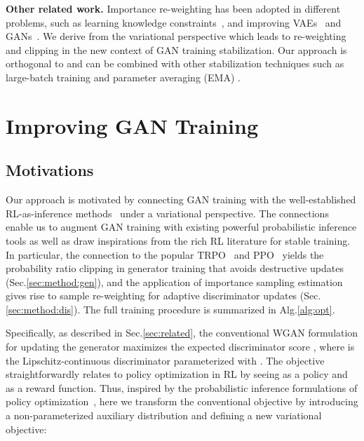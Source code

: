 \documentclass{article}
\newcommand{\0}{\bm{0}}
\begin{document}
\textbf{Other related work.} 
Importance re-weighting has been adopted in different problems, such as learning knowledge constraints~\cite{hu2018deep}, and improving VAEs~\cite{burda2015importance} and GANs~\citep{hu2017unifying,song2019bridging}. 
We derive from the variational perspective which leads to re-weighting and clipping in the new context of GAN training stabilization. Our approach is orthogonal to and can be combined with other stabilization techniques such as large-batch training \citep{brock2018large} and parameter averaging (EMA) \citep{yaz2018unusual,brock2018large}. 










\section{Improving GAN Training}
\subsection{Motivations}
Our approach is motivated by connecting GAN training with the well-established RL-as-inference methods~\cite{abdolmaleki2018maximum,levine2018reinforcement,tan2018connecting} under a variational perspective. 
The connections enable us to augment GAN training with existing powerful probabilistic inference tools as well as draw inspirations from the rich RL literature for stable training. In particular, the connection to the popular TRPO~\cite{TRPO} and PPO~\cite{PPO} yields the probability ratio clipping in generator training that avoids destructive updates  (Sec.\ref{sec:method:gen}), and the application of importance sampling estimation gives rise to sample re-weighting for adaptive discriminator updates (Sec.\ref{sec:method:dis}). The full training procedure is summarized in Alg.\ref{alg:opt}.

Specifically, as described in Sec.\ref{sec:related}, the conventional WGAN formulation for updating the generator  maximizes the expected discriminator score , where  is the Lipschitz-continuous discriminator parameterized with . The objective straightforwardly relates to policy optimization in RL by seeing  as a policy and  as a reward function. Thus, inspired by the probabilistic inference formulations of policy optimization~\cite{abdolmaleki2018maximum,hu2018deep,tan2018connecting}, here we transform the conventional objective by introducing a non-parameterized auxiliary distribution  and defining a new variational objective:
\end{document}
